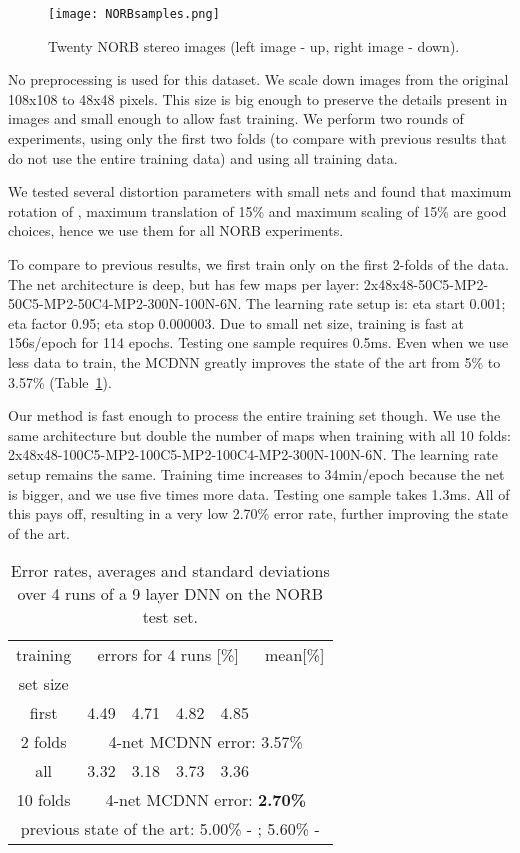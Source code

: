 \documentclass[a4paper]{article}
\begin{document}
\begin{figure}[ht!]
\hfill
\begin{center}
\texttt{[image: NORBsamples.png]}
\end{center}
\caption{Twenty NORB stereo images (left image - up, right image - down).}
\label{Fig:NORBsamples}
\end{figure}

No preprocessing is used for this dataset.  We scale down images from the original 108x108 to 48x48 pixels. This size is big enough to preserve the details present in images and small enough to allow fast training. We perform two rounds of experiments, using only the first two folds (to compare with previous results that do not use the entire training data) and using all training data.

We tested several distortion parameters with small nets and found that maximum rotation of , maximum translation of 15\% and maximum scaling of 15\% are good choices, hence we use them for all NORB experiments.

To compare to previous results, we first train only on the first 2-folds of the data. The net architecture is deep, but has few maps per layer:  2x48x48-50C5-MP2-50C5-MP2-50C4-MP2-300N-100N-6N. The learning rate setup is: eta start 0.001; eta factor 0.95; eta stop 0.000003. Due to small net size, training is fast at 156s/epoch for 114 epochs. Testing one sample requires 0.5ms.  Even when we use less data to train, the MCDNN greatly improves the state of the art from 5\% to 3.57\% (Table~\ref{tab:NORBresults}).

Our method is fast enough to process the entire training set though. We use the same architecture but double the number of maps when training with all 10 folds: 2x48x48-100C5-MP2-100C5-MP2-100C4-MP2-300N-100N-6N. The learning rate setup remains the same. Training time increases to 34min/epoch because the net is bigger, and we use five times more data. Testing one sample takes 1.3ms. All of this pays off, resulting in a very low 2.70\% error rate, further improving the state of the art.

\begin{table}[!t]
\caption{Error rates, averages and standard deviations over 4 runs of a 9 layer DNN on the NORB  test set.}
\label{tab:NORBresults}
\centering
\begin{tabular}{c|cccc|c}
training	& \multicolumn{4}{c}{errors for 4 runs [\%]}				&	mean[\%]			\\
set size	&  \multicolumn{4}{c}{}		&				\\
\hline
first			&	4.49		&	4.71		&	4.82		&	4.85		&			\\
2 folds		& 	\multicolumn{5}{c}{4-net MCDNN error:	3.57\%}\\
\hline
all 			&	3.32		&	3.18		&	3.73		&	3.36		&			\\
10 folds		& 	\multicolumn{5}{c}{4-net MCDNN error:	{\bf 2.70\%}}\\
\hline
\hline
 \multicolumn{6}{c}{previous state of the art: 5.00\% - \cite{CoatesICML:2011}; 5.60\% - \cite{scherer:2010}}\\
\end{tabular}
\end{table}
\end{document}
